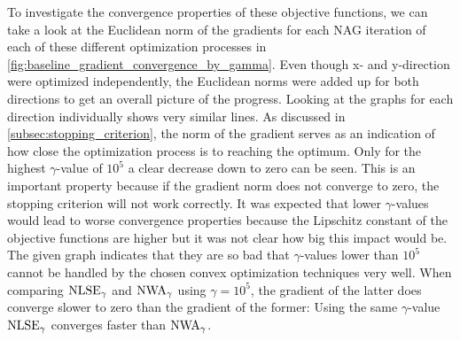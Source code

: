 To investigate the convergence properties of these objective functions,
we can take a look at the Euclidean norm 
of the gradients for each NAG iteration of each of these different optimization processes
in \cref{fig:baseline_gradient_convergence_by_gamma}.
Even though x- and y-direction were optimized independently, the Euclidean norms
were added up for both directions to get an overall picture of the progress.
Looking at the graphs for each direction individually shows very similar lines.
As discussed in \cref{subsec:stopping_criterion}, the norm of the gradient serves as an indication
of how close the optimization process is to reaching the optimum.
Only for the highest \(\gamma\)-value of \(10^5\) a clear decrease down to zero can be seen.
This is an important property because if the gradient norm does not converge to zero,
the stopping criterion will not work correctly.
It was expected that lower \(\gamma\)-values would lead to worse convergence properties
because the Lipschitz constant of the objective functions are higher
but it was not clear how big this impact would be.
The given graph indicates that they are so bad that \(\gamma\)-values lower than \(10^5\)
cannot be handled by the chosen convex optimization techniques very well.
When comparing \(\operatorname{NLSE}_\gamma\) and \(\operatorname{NWA}_\gamma\) using \(\gamma = 10^5\),
the gradient of the latter does converge slower to zero than the gradient of the former:
Using the same \(\gamma\)-value \(\operatorname{NLSE}_\gamma\) converges faster than \(\operatorname{NWA}_\gamma\).

